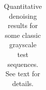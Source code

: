 \documentclass[10pt, journal, twocolumn, final, a4paper]{IEEEtran}
\newcommand{\bsic}[1]{\textcolor{black}{\textit{#1}}}
\newcommand{\Bsic}[1]{\textcolor{black}{\textbf{\textit{#1}}}}
\newcommand{\Best}[1]{\textbf{\textcolor{black}{#1}}}
\begin{document}
\begin{table}[htp!]
\begin{center}
{\begin{tabular}{ c | l |c c | c c | c c | c c | c c | c c | c }
		\end{tabular}}
	\end{center}
	\caption{Quantitative denoising results for some classic grayscale test sequences. See text for details.}
	\label{tab:psnr-classic-gray}
\end{table}
\end{document}
